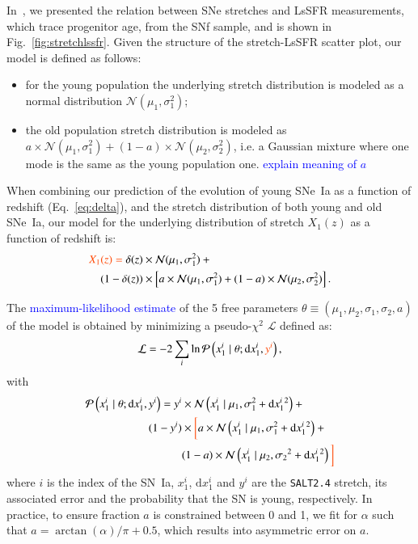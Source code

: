 \documentclass[]{aa} %
\newcommand{\nn}[1]{{\textcolor[rgb]{1, 0.27, 0}{#1}}}
\newcommand{\yc}[1]{{\textcolor{blue}{#1}}}
\newcommand{\prob}[2]{\mathcal{P}\left( #1 \mid #2\right)}
\begin{document}
\nn{In~\cite{rigault2018}, we presented the relation between SNe stretches and
LsSFR measurements, which trace progenitor age, from the SNf sample, and is
shown in Fig.~\ref{fig:stretchlssfr}}. Given the structure of the
stretch-LsSFR scatter plot, our model is defined as follows: 
\begin{itemize}
    \item for the young population the underlying stretch distribution
    is modeled as a normal distribution $\mathcal{N}(\mu_1, \sigma_1^2)$; 
    \item the old population stretch distribution is modeled as $a\times \mathcal{N}(\mu_1, \sigma_1^2) + (1-a)\times
    \mathcal{N}(\mu_2, \sigma_2^2)$, i.e. a Gaussian mixture where one mode is the
    same as the young population one. \yc{explain meaning of $a$}
\end{itemize}
\nn{When combining our prediction of the
evolution of young SNe~Ia as a function of redshift (Eq.~\ref{eq:delta}),
and the stretch distribution of both young and old SNe~Ia, our model for the
underlying distribution of stretch $X_1(z)$ as a function of
redshift is:}
\begin{align}
    \label{eq:stretchz}
    \nn{X_1(z) = {}}
    \delta(z) &\times \mathcal{N}(\mu_1,\sigma_1^2) + {}\nonumber\\
    (1 - \delta(z)) &\times \left[a\times\mathcal{N}(\mu_1,\sigma_1^2) +
    (1-a)\times\mathcal{N}(\mu_2,\sigma_2^2)\right].
\end{align}

The \yc{maximum-likelihood estimate} of the 5 free parameters
$\theta\equiv({\mu_1,\mu_2,\sigma_1,\sigma_2,a})$ of the model is obtained by
minimizing a pseudo-$\chi^2$ $\mathcal{L}$ defined as:
\begin{equation}
    \label{eq:likelihood}
    \mathcal{L} = -2 \sum_i \ln \prob{x^{i}_{1}}{\theta;
    \mathrm{d}x^{i}_{1}, \nn{y^i}},
\end{equation}
with
\begin{align}
    \label{eq:likelihoodsnf}
    \prob{x^{i}_{1}}{\theta; \mathrm{d}x^{i}_{1}, y^i} =
    y^i &\times \mathcal{N}\left(x^{i}_{1} \mid \mu_1, \sigma_{1}^{2}+\mathrm{d}x^{i}_{1}{}^{2}\right) + {} \nonumber\\
        (1-y^i) &\times \nn{\bigg[} 
        a \times \mathcal{N}\left(x^{i}_{1} \mid \mu_1,
        \sigma_{1}^{2}+\mathrm{d}x^{i}_{1}{}^{2}\right) + {} \nonumber\\
     &(1-a) \times \mathcal{N}\left(x^{i}_{1} \mid \mu_2,
     \sigma_2{}^{2}+\mathrm{d}x^{i}_{1}{}^{2}\right) \nn{\bigg]}
\end{align}
where $i$ is the index of the SN~Ia, $x^{i}_{1}$, $\mathrm{d}x^{i}_{1}$ and
$y^i$ are the \textsc{\texttt{SALT2.4}} stretch, its associated error 
and the probability that the SN is young, respectively. 
In practice, to ensure fraction $a$ is constrained between 0 and 1,
we fit for $\alpha$ such
that $a=\arctan(\alpha)/\pi+0.5$, which results into asymmetric error on $a$.
\end{document}
